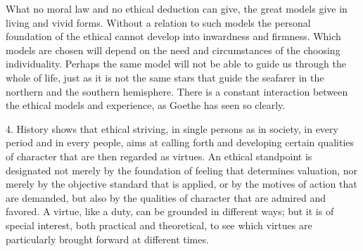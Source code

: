 \documentclass[12pt,a4paper,openany]{book}
\newcommand{\opage}[1]{\marginnote{\footnotesize\textit{[#1]}}}
\begin{document}
What no moral law and no ethical deduction can give, the great models give in living and vivid forms. Without a
relation to such models the personal foundation of the ethical cannot develop into inwardness and firmness. Which
models are chosen will depend on the need and circumstances of the choosing individuality.
Perhaps the same model will not be able to guide us
through the whole of life, just as it is not the same stars that guide the seafarer in
\opage{201}the northern and the southern hemisphere. There is a constant interaction between the ethical models and
experience, as Goethe has seen so clearly.

4. History shows that ethical striving, in single persons as in society, in every period and in every people,
aims at calling forth and developing certain qualities of character that are then regarded as virtues. An
ethical standpoint is designated not merely by the foundation of feeling that determines valuation, nor merely
by the objective standard that is applied, or by the motives of action that are demanded, but also by the
qualities of character that are admired and favored. A virtue, like a duty, can be grounded in different ways;
but it is of special interest, both practical and theoretical, to see which virtues are particularly brought
forward at different times.
\end{document}
